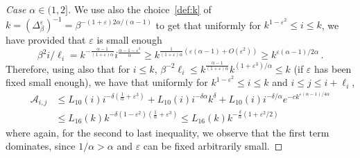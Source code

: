 \documentclass[10pt]{amsart}
\theoremstyle{definition}\newtheorem{defi}[theo]{Definition}\newtheorem{rema}[theo]{Remark}\newtheorem{exam}[theo]{Example}\newtheorem{exem}[theo]{Example}\newtheorem{nota}[theo]{Notation}
\newenvironment{step}[1]{\begin{proof}[{#1}]}{\let\qed\relax\end{proof}}
\newcommand{\ga}{\alpha}
\newcommand{\gb}{\beta}
\newcommand{\gd}{\delta}
\newcommand{\gep}{\varepsilon}
\newcommand{\gD}{\Delta}
\newcommand{\cA}{\ensuremath{\mathcal{A}}}
\begin{document}
\begin{step}{{Case $\ga\in(1,2]$}}%
We use also the choice~\eqref{def:k} of $k=(\gD_{\gb}^{\gep})^{-1} = \gb^{-(1+\gep) 2\ga /(\ga-1)} $ to get that uniformly for $k^{1-\gep^2} \leq i\leq k$, we have provided that $\gep$ is small enough
\begin{equation}
\gb^2 i /\ell_i = k^{- \frac{\ga-1}{(1+\gep)\ga}} i^{\frac{\ga -1-\gep^3}{\ga}} \geq k^{ \frac{1}{(1+\gep) \ga} (\gep (\ga-1) +O(\gep^2))}\geq k^{\gep (\ga-1)/2\ga}\,.
\end{equation}
Therefore, using also that for $i\leq k$, $\gb^{-2} \ell_i \leq k^{\frac{\ga-1}{(1+\gep) \ga}} k^{(1+\gep^3)/\ga} \leq k$ (if $\gep$ has been fixed small enough), we have that uniformly for $k^{1-\gep^2} \leq i\leq k$ and $i\leq j\leq i+ \ell_i$,
\begin{equation}\label{boundA1}
\begin{split}
\cA_{i,j} &\leq L_{10}(i) i^{-\gd(\frac1\ga +\gep^3)} + L_{10}(i) i^{-\gd \ga} k^{\gd} + L_{10}(i) i^{-\gd/\ga} e^{-c k^{\gep (\ga-1)/4\ga }} \\
& \leq L_{16}(k) k^{-\gd(1-\gep^2)(\frac1\ga +\gep^3) } \leq L_{16}(k) k^{-\frac{\gd}{\ga} (1 + \gep^2 /2) }
\end{split}
\end{equation}
where again, for the second to last inequality, we observe that the first term dominates, since $1/\ga >\ga$ and $\gep$ can be fixed arbitrarily small.
\end{step}
\end{document}
